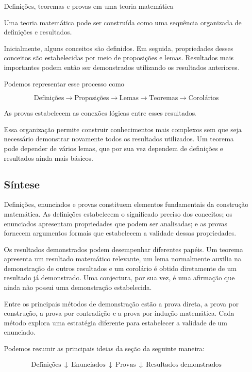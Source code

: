 \documentclass[
  brazilian,
  letterpaper,
]{book}
\theoremstyle{plain}
\theoremstyle{definition}
\theoremstyle{remark}
\begin{document}
Definições, teoremas e provas em uma teoria matemática

Uma teoria matemática pode ser construída como uma sequência organizada
de definições e resultados.

Inicialmente, alguns conceitos são definidos. Em seguida, propriedades
desses conceitos são estabelecidas por meio de proposições e lemas.
Resultados mais importantes podem então ser demonstrados utilizando os
resultados anteriores.

Podemos representar esse processo como

\[
\boxed{
\text{Definições}
\rightarrow
\text{Proposições}
\rightarrow
\text{Lemas}
\rightarrow
\text{Teoremas}
\rightarrow
\text{Corolários}
}
\]

As provas estabelecem as conexões lógicas entre esses resultados.

Essa organização permite construir conhecimentos mais complexos sem que
seja necessário demonstrar novamente todos os resultados utilizados. Um
teorema pode depender de vários lemas, que por sua vez dependem de
definições e resultados ainda mais básicos.

\subsection{Síntese}\label{suxedntese-1}

Definições, enunciados e provas constituem elementos fundamentais da
construção matemática. As definições estabelecem o significado preciso
dos conceitos; os enunciados apresentam propriedades que podem ser
analisadas; e as provas fornecem argumentos formais que estabelecem a
validade dessas propriedades.

Os resultados demonstrados podem desempenhar diferentes papéis. Um
teorema apresenta um resultado matemático relevante, um lema normalmente
auxilia na demonstração de outros resultados e um corolário é obtido
diretamente de um resultado já demonstrado. Uma conjectura, por sua vez,
é uma afirmação que ainda não possui uma demonstração estabelecida.

Entre os principais métodos de demonstração estão a prova direta, a
prova por construção, a prova por contradição e a prova por indução
matemática. Cada método explora uma estratégia diferente para
estabelecer a validade de um enunciado.

Podemos resumir as principais ideias da seção da seguinte maneira:

\[
\boxed{
\begin{array}{c}
\text{Definições}\
\downarrow\
\text{Enunciados}\
\downarrow\
\text{Provas}\
\downarrow\
\text{Resultados demonstrados}
\end{array}}
\]
\end{document}
